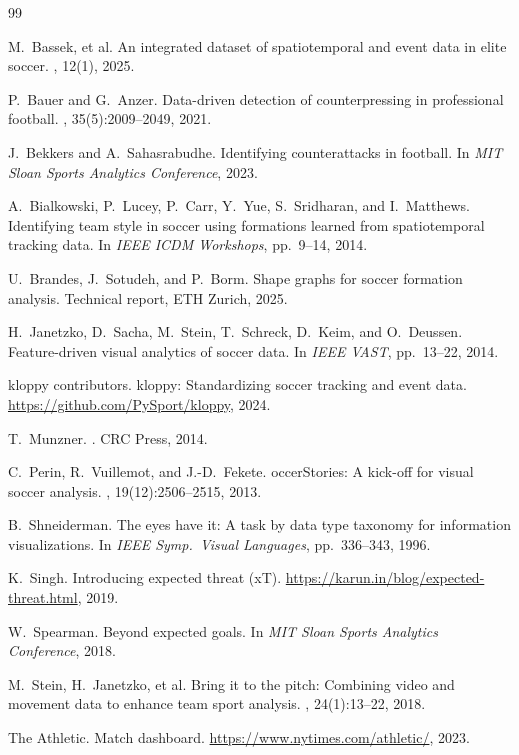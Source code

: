 \documentclass{vgtc}                          %
\begin{document}
\begin{thebibliography}{99}

M.~Bassek, et al.
\newblock An integrated dataset of spatiotemporal and event data in elite soccer.
, 12(1), 2025.

P.~Bauer and G.~Anzer.
\newblock Data-driven detection of counterpressing in professional football.
, 35(5):2009--2049, 2021.

J.~Bekkers and A.~Sahasrabudhe.
\newblock Identifying counterattacks in football.
\newblock In {\em MIT Sloan Sports Analytics Conference}, 2023.

A.~Bialkowski, P.~Lucey, P.~Carr, Y.~Yue, S.~Sridharan, and I.~Matthews.
\newblock Identifying team style in soccer using formations learned from spatiotemporal tracking data.
\newblock In {\em IEEE ICDM Workshops}, pp.~9--14, 2014.

U.~Brandes, J.~Sotudeh, and P.~Borm.
\newblock Shape graphs for soccer formation analysis.
\newblock Technical report, ETH Zurich, 2025.

H.~Janetzko, D.~Sacha, M.~Stein, T.~Schreck, D.~Keim, and O.~Deussen.
\newblock Feature-driven visual analytics of soccer data.
\newblock In {\em IEEE VAST}, pp.~13--22, 2014.

kloppy contributors.
\newblock kloppy: Standardizing soccer tracking and event data.
\newblock \url{https://github.com/PySport/kloppy}, 2024.

T.~Munzner.
.
\newblock CRC Press, 2014.

C.~Perin, R.~Vuillemot, and J.-D.~Fekete.
occer{S}tories: A kick-off for visual soccer analysis.
, 19(12):2506--2515, 2013.

B.~Shneiderman.
\newblock The eyes have it: A task by data type taxonomy for information visualizations.
\newblock In {\em IEEE Symp.\ Visual Languages}, pp.~336--343, 1996.

K.~Singh.
\newblock Introducing expected threat ({xT}).
\newblock \url{https://karun.in/blog/expected-threat.html}, 2019.

W.~Spearman.
\newblock Beyond expected goals.
\newblock In {\em MIT Sloan Sports Analytics Conference}, 2018.

M.~Stein, H.~Janetzko, et al.
\newblock Bring it to the pitch: Combining video and movement data to enhance team sport analysis.
, 24(1):13--22, 2018.

The Athletic.
\newblock Match dashboard.
\newblock \url{https://www.nytimes.com/athletic/}, 2023.

\end{thebibliography}
\end{document}
